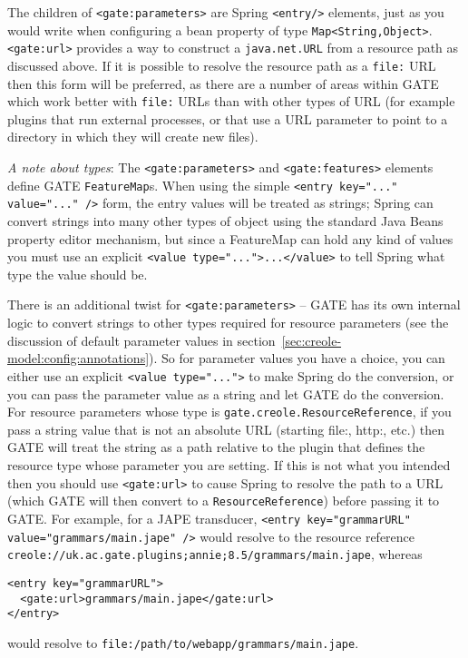 The children of \verb|<gate:parameters>| are Spring \verb|<entry/>|
elements, just as you would write when configuring a bean property of
type \verb|Map<String,Object>|.  \verb|<gate:url>| provides a way to construct
a \verb|java.net.URL| from a resource path as discussed above.  If it is
possible to resolve the resource path as a \verb|file:| URL then this form will
be preferred, as there are a number of areas within GATE which work better with
\verb|file:| URLs than with other types of URL (for example plugins that run
external processes, or that use a URL parameter to point to a directory in
which they will create new files).

\emph{A note about types}: The \verb|<gate:parameters>| and
\verb|<gate:features>| elements define GATE \verb|FeatureMap|s.  When using the
simple \verb|<entry key="..." value="..." />| form, the entry values will be
treated as strings; Spring can convert strings into many other types of object
using the standard Java Beans property editor mechanism, but since a FeatureMap
can hold any kind of values you must use an explicit
\verb|<value type="...">...</value>| to tell Spring what type the value should
be.

There is an additional twist for \verb|<gate:parameters>| -- GATE has its own
internal logic to convert strings to other types required for resource
parameters (see the discussion of default parameter values in
section~\ref{sec:creole-model:config:annotations}).  So for parameter values you have a
choice, you can either use an explicit \verb|<value type="...">| to make Spring
do the conversion, or you can pass the parameter value as a string and let GATE
do the conversion.  For resource parameters whose type is
\verb|gate.creole.ResourceReference|, if you pass a string value that is not an
absolute URL (starting file:, http:, etc.) then GATE will treat the string as a
path relative to the plugin that defines the resource type whose parameter you
are setting.  If this is not what you intended then you should use
\verb|<gate:url>| to cause Spring to resolve the path to a URL (which GATE will
then convert to a \verb!ResourceReference!) before passing it to GATE.  For
example, for a JAPE transducer,
\verb|<entry key="grammarURL" value="grammars/main.jape" />| would resolve to
the resource reference
\verb!creole://uk.ac.gate.plugins;annie;8.5/grammars/main.jape!, whereas
%
\begin{small}\begin{verbatim}
<entry key="grammarURL">
  <gate:url>grammars/main.jape</gate:url>
</entry>
\end{verbatim}\end{small}
would resolve to \verb|file:/path/to/webapp/grammars/main.jape|.


